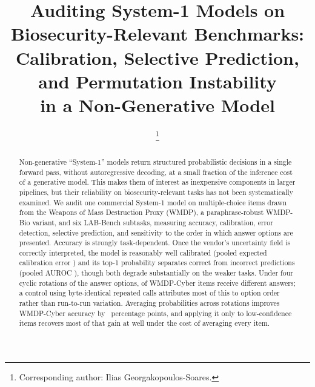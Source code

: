 \documentclass[conference,compsoc]{IEEEtran}
\begin{document}
\title{Auditing System-1 Models on Biosecurity-Relevant Benchmarks:\\
Calibration, Selective Prediction, and Permutation Instability\\
in a Non-Generative Model}

\author{%
\thanks{Corresponding author: Ilias Georgakopoulos-Soares.}
}

\maketitle

\begin{abstract}
Non-generative ``System-1'' models return structured probabilistic decisions in a single
forward pass, without autoregressive decoding, at a small fraction of the inference cost of
a generative model. This makes them of interest as inexpensive components in larger
pipelines, but their reliability on biosecurity-relevant tasks has not been systematically
examined. We audit one commercial System-1 model on \statNItems{} multiple-choice items
drawn from the Weapons of Mass Destruction Proxy (WMDP), a paraphrase-robust WMDP-Bio
variant, and six LAB-Bench subtasks, measuring accuracy, calibration, error detection,
selective prediction, and sensitivity to the order in which answer options are presented.
Accuracy is strongly task-dependent. Once the vendor's uncertainty field is correctly
interpreted, the model is reasonably well calibrated (pooled expected calibration error
\statEcePmax{}) and its top-1 probability separates correct from incorrect predictions
(pooled AUROC \statAurocPooled{}), though both degrade substantially on the weaker tasks.
Under four cyclic rotations of the answer options, \statInconsistCyber{} of WMDP-Cyber
items receive different answers; a control using byte-identical repeated calls attributes
most of this to option order rather than run-to-run variation. Averaging probabilities
across rotations improves WMDP-Cyber accuracy by \statEnsGainCyber{}~percentage points,
and applying it only to low-confidence items recovers most of that gain at well under the
cost of averaging every item.
\end{abstract}
\end{document}
